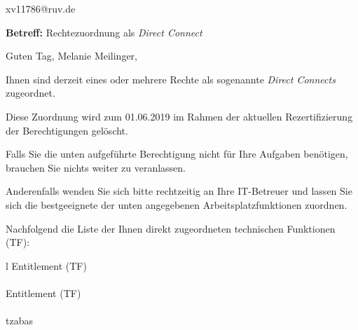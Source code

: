 \documentclass[a4paper,landscape,12pt]{letter}
\begin{document}
\begin{letter}{xv11786@ruv.de\hfill \break}
\begin{normalsize}
	\opening{\textbf{Betreff:} Rechtezuordnung als \emph{Direct Connect}}
	\begin{normalsize} \hfill
	\end{normalsize}

	\begin{normalsize}
		Guten Tag, 
	Melanie Meilinger, \hfill \break
	\end{normalsize}
	\end{normalsize}
	
\begin{normalsize}
	Ihnen sind derzeit eines oder mehrere Rechte als sogenannte \emph{Direct Connects} zugeordnet.
	
	Diese Zuordnung wird zum 01.06.2019 im Rahmen der aktuellen Rezertifizierung der Berechtigungen gelöscht.
	
	Falls Sie die unten aufgeführte Berechtigung nicht für Ihre Aufgaben benötigen, 
	brauchen Sie nichts weiter zu veranlassen.
	
	Anderenfalls wenden Sie sich bitte rechtzeitig an Ihre IT-Betreuer 
	und lassen Sie sich die bestgeeignete der unten angegebenen Arbeitsplatzfunktionen zuordnen.
	\end{normalsize}
	
\begin{normalsize}
	Nachfolgend die Liste der Ihnen direkt zugeordneten technischen Funktionen (TF):

	\begin{longtable}{l}
		Entitlement (TF) \\ \hline
		\endfirsthead
		\\\hline
		Entitlement (TF) \\ \hline
		\endhead %
		\multicolumn{1}{r@{}}{Fortsetzung \ldots}\\
		\endfoot
		\hline
		\endlastfoot
	tzabas\\
	\end{longtable}
	\end{normalsize}
	

\end{letter}
\end{document}
